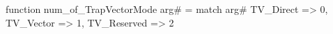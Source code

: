 function num_of_TrapVectorMode arg# = match arg# {
  TV_Direct => 0,
  TV_Vector => 1,
  TV_Reserved => 2
}
